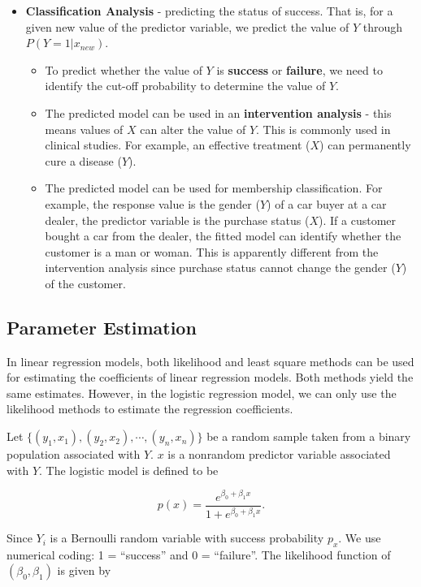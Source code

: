 \documentclass[
]{book}
\begin{document}
\begin{itemize}
\item
  \textbf{Classification Analysis} - predicting the status of success. That is, for a given new value of the predictor variable, we predict the value of \(Y\) through \(P(Y=1|x_{new})\).

  \begin{itemize}
  \item
    To predict whether the value of \(Y\) is \textbf{success} or \textbf{failure}, we need to identify the cut-off probability to determine the value of \(Y\).
  \item
    The predicted model can be used in an \textbf{intervention analysis} - this means values of \(X\) can alter the value of \(Y\). This is commonly used in clinical studies. For example, an effective treatment (\(X\)) can permanently cure a disease (\(Y\)).
  \item
    The predicted model can be used for membership classification. For example, the response value is the gender (\(Y\)) of a car buyer at a car dealer, the predictor variable is the purchase status (\(X\)). If a customer bought a car from the dealer, the fitted model can identify whether the customer is a man or woman. This is apparently different from the intervention analysis since purchase status cannot change the gender (\(Y\)) of the customer.
  \end{itemize}
\end{itemize}

\hypertarget{parameter-estimation}{%
\subsection{Parameter Estimation}\label{parameter-estimation}}

In linear regression models, both likelihood and least square methods can be used for estimating the coefficients of linear regression models. Both methods yield the same estimates. However, in the logistic regression model, we can only use the likelihood methods to estimate the regression coefficients.

Let \(\{(y_1, x_1), (y_2, x_2), \cdots, (y_n, x_n)\}\) be a random sample taken from a binary population associated with \(Y\). \(x\) is a nonrandom predictor variable associated with \(Y\). The logistic model is defined to be

\[
p(x) = \frac{e^{\beta_0 + \beta_1 x}}{1 + e^{\beta_0 + \beta_1 x}}.
\]

Since \(Y_i\) is a Bernoulli random variable with success probability \(p_x\). We use numerical coding: 1 = ``success'' and 0 = ``failure''. The likelihood function of \((\beta_0, \beta_1)\) is given by
\end{document}
